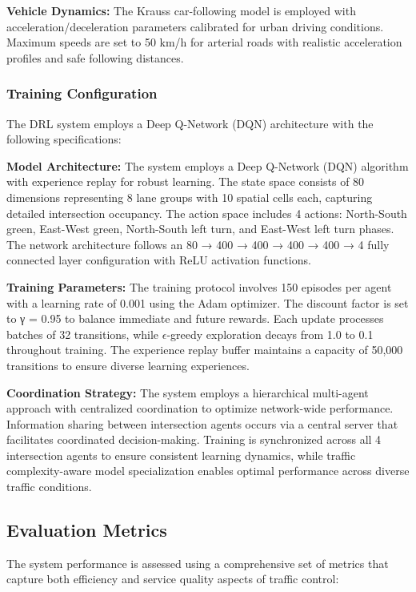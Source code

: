 \textbf{Vehicle Dynamics:} The Krauss car-following model is employed with acceleration/deceleration 
parameters calibrated for urban driving conditions. Maximum speeds are set to 50 km/h for arterial 
roads with realistic acceleration profiles and safe following distances.

\subsubsection{Training Configuration}

The DRL system employs a Deep Q-Network (DQN) architecture with the following specifications:

\textbf{Model Architecture:} The system employs a Deep Q-Network (DQN) algorithm with experience 
replay for robust learning. The state space consists of 80 dimensions representing 8 lane groups 
with 10 spatial cells each, capturing detailed intersection occupancy. The action space includes 
4 actions: North-South green, East-West green, North-South left turn, and East-West left turn phases. 
The network architecture follows an 80 → 400 → 400 → 400 → 400 → 4 fully connected layer 
configuration with ReLU activation functions.

\textbf{Training Parameters:} The training protocol involves 150 episodes per agent with a learning 
rate of 0.001 using the Adam optimizer. The discount factor is set to γ = 0.95 to balance immediate 
and future rewards. Each update processes batches of 32 transitions, while $\epsilon$-greedy exploration 
decays from 1.0 to 0.1 throughout training. The experience replay buffer maintains a capacity of 
50,000 transitions to ensure diverse learning experiences.

\textbf{Coordination Strategy:} The system employs a hierarchical multi-agent approach with centralized 
coordination to optimize network-wide performance. Information sharing between intersection agents 
occurs via a central server that facilitates coordinated decision-making. Training is synchronized 
across all 4 intersection agents to ensure consistent learning dynamics, while traffic complexity-aware 
model specialization enables optimal performance across diverse traffic conditions.

\subsection{Evaluation Metrics}\label{subsec2b-2}

The system performance is assessed using a comprehensive set of metrics that capture both 
efficiency and service quality aspects of traffic control:

